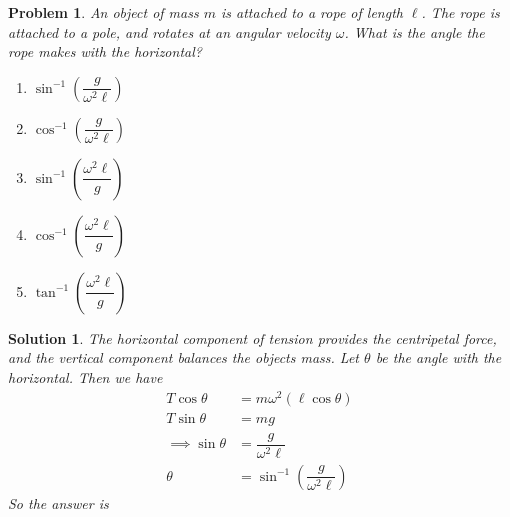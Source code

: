 \documentclass[12pt]{article}
\newcommand{\clearpts}{\addtocounter{tpts}{\value{cpts}} \setcounter{cpts}{0}}
\newcommand{\pts}[1]{\clearpts \setcounter{cpts}{#1}}
\newtheorem*{solution}{Solution}
\theoremstyle{mystyle}
\newtheorem{pproblem}{Problem}
\begin{document}
\pts{2}
\begin{pproblem}
    An object of mass $m$ is attached to a rope of length $\ell$.
    The rope is attached to a pole, and rotates at an angular velocity $\omega$. What is the angle the rope makes with the horizontal?
    \begin{enumerate}[label=(\Alph*)]
        \item $\sin^{-1}\left(\dfrac{g}{\omega^2\ell}\right)$
        \item $\cos^{-1}\left(\dfrac{g}{\omega^2\ell}\right)$
        \item $\sin^{-1}\left(\dfrac{\omega^2\ell}{g}\right)$
        \item $\cos^{-1}\left(\dfrac{\omega^2\ell}{g}\right)$
        \item $\tan^{-1}\left(\dfrac{\omega^2\ell}{g}\right)$
    \end{enumerate}
\end{pproblem}
\begin{solution}
    The horizontal component of tension provides the centripetal force,
    and the vertical component balances the objects mass. Let $\theta$ be the angle with the horizontal. Then we have
    \begin{align*}
        T\cos\theta&=m\omega^2(\ell\cos\theta)\\
        T\sin\theta&=mg\\
        \implies \sin\theta&=\dfrac{g}{\omega^2\ell}\\
        \theta&=\sin^{-1}\left(\dfrac{g}{\omega^2\ell}\right)
    \end{align*}
    So the answer is 
\end{solution}
\end{document}
